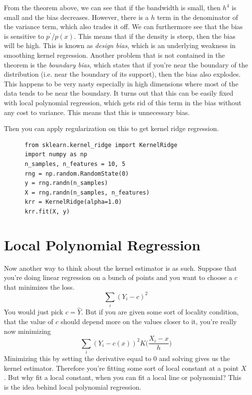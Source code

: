 \documentclass{article}
\begin{document}
  From the theorem above, we can see that if the bandwidth is small, then $h^4$ is small and the bias decreases. However, there is a $h$ term in the denominator of the variance term, which also trades it off. We can furthermore see that the bias is sensitive to $p^\prime / p(x)$. This means that if the density is steep, then the bias will be high. This is known as \textit{design bias}, which is an underlying weakness in smoothing kernel regression. Another problem that is not contained in the theorem is the \textit{boundary bias}, which states that if you're near the boundary of the distribution (i.e. near the boundary of its support), then the bias also explodes. This happens to be very nasty especially in high dimensions where most of the data tends to be near the boundary. It turns out that this can be easily fixed with local polynomial regression, which gets rid of this term in the bias without any cost to variance. This means that this is unnecessary bias. 

  Then you can apply regularization on this to get kernel ridge regression. 

  \begin{code}
    \begin{lstlisting}
      from sklearn.kernel_ridge import KernelRidge
      import numpy as np
      n_samples, n_features = 10, 5
      rng = np.random.RandomState(0)
      y = rng.randn(n_samples)
      X = rng.randn(n_samples, n_features)
      krr = KernelRidge(alpha=1.0)
      krr.fit(X, y)
    \end{lstlisting}
  \end{code}

\section{Local Polynomial Regression}

  Now another way to think about the kernel estimator is as such. Suppose that you're doing linear regression on a bunch of points and you want to choose a $c$ that minimizes the loss. 
  \begin{equation}
    \sum_i (Y_i - c)^2
  \end{equation}
  You would just pick $c = \hat{Y}$. But if you are given some sort of locality condition, that the value of $c$ should depend more on the values closer to it, you're really now minimizing 
  \begin{equation}
    \sum_i (Y_i - c(x))^2 K \bigg( \frac{X_i - x}{h} \bigg)
  \end{equation}
  Minimizing this by setting the derivative equal to $0$ and solving gives us the kernel estimator. Therefore you're fitting some sort of local constant at a point $X$. But why fit a local constant, when you can fit a local line or polynomial? This is the idea behind local polynomial regression.
\end{document}
